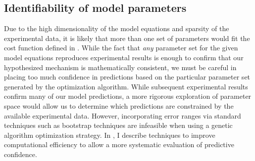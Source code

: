 \subsection{Identifiability of model parameters}
Due to the high dimensionality of the model equations and sparsity of the experimental data, it is likely that more than one set of parameters would fit the cost function defined in . 
While the fact that {\itshape any} parameter set for the given model equations reproduces experimental results is enough to confirm that our hypothesized mechanism is mathematically consistent, we must be careful in placing too much confidence in predictions based on the particular parameter set generated by the optimization algorithm. 
While subsequent experimental results confirm many of our model predictions, a more rigorous exploration of parameter space would allow us to determine which predictions are constrained by the available experimental data. 
However, incorporating error ranges via standard techniques such as bootstrap techniques are infeasible when using a genetic algorithm optimization strategy. 
In , I describe techniques to improve computational efficiency to allow a more systematic evaluation of predictive confidence.
